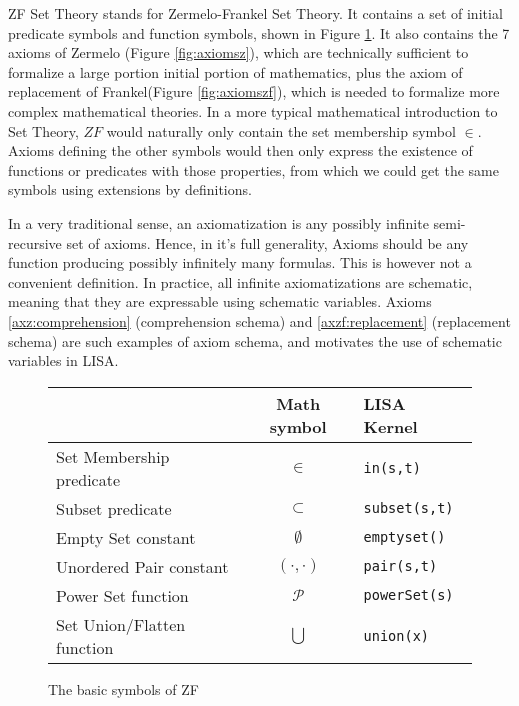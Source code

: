 ZF Set Theory stands for Zermelo-Frankel Set Theory. It contains a set of initial predicate symbols and function symbols, shown in Figure \ref{fig:symbolszf}. It also contains the 7 axioms of Zermelo (Figure \ref{fig:axiomsz}), which are technically sufficient to formalize a large portion initial portion of mathematics, plus the axiom of replacement of Frankel(Figure \ref{fig:axiomszf}), which is needed to formalize more complex mathematical theories. 
In a more typical mathematical introduction to Set Theory, $ZF$ would naturally only contain the set membership symbol $\in$. Axioms defining the other symbols would then only express the existence of functions or predicates with those properties, from which we could get the same symbols using extensions by definitions.

In a very traditional sense, an axiomatization is any possibly infinite semi-recursive set of axioms. Hence, in it's full generality, Axioms should be any function producing possibly infinitely many formulas.
This is however not a convenient definition. In practice, all infinite axiomatizations are schematic, meaning that they are expressable using schematic variables. Axioms \ref{axz:comprehension} (comprehension schema) and \ref{axzf:replacement} (replacement schema) are such examples of axiom schema, and motivates the use of schematic variables in LISA.



\begin{figure}
\begin{center}
\begin{tabular}{l|c|l}
{} & Math symbol & LISA Kernel\\ \hline
Set Membership predicate & $\in$ & \lstinline$in(s,t)$\\
Subset predicate & $\subset$ & \lstinline$subset(s,t)$ \\
Empty Set constant & $\emptyset$ & \lstinline$emptyset()$ \\
Unordered Pair constant & $(\cdot, \cdot )$ & \lstinline$pair(s,t)$ \\
Power Set function & $\mathcal P$ & \lstinline$powerSet(s)$ \\
Set Union/Flatten function & $\bigcup$ & \lstinline$union(x)$ \\
\end{tabular}
\caption{The basic symbols of ZF}
\label{fig:symbolszf}
\end{center}
\end{figure}

